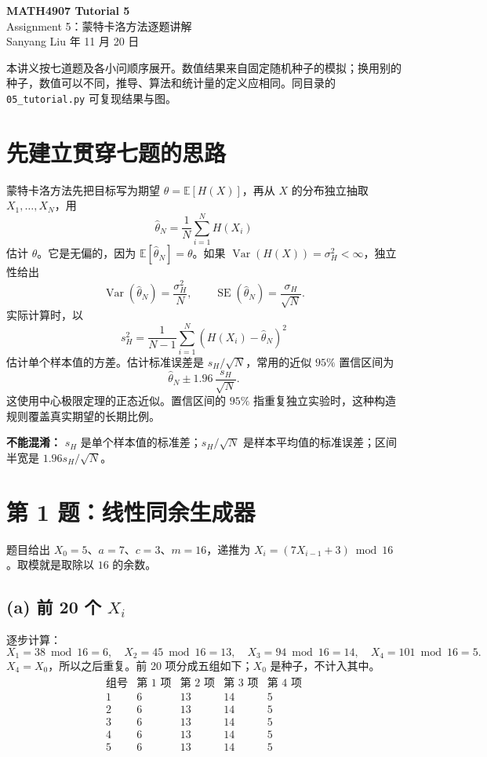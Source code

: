 \documentclass[UTF8,11pt,a4paper,fontset=none]{ctexart}
\newcommand{\E}{\mathbb E}
\newcommand{\Var}{\operatorname{Var}}
\newcommand{\SE}{\operatorname{SE}}
\begin{document}
\begin{center}
{\huge\bfseries\color{deepblue} MATH4907 Tutorial 5}\\[3mm]
{\Large Assignment 5：蒙特卡洛方法逐题讲解}\\[5mm]
Sanyang Liu  年 11 月 20 日
\end{center}
\vspace{3mm}
\begin{idea}
本讲义按七道题及各小问顺序展开。数值结果来自固定随机种子的模拟；换用别的种子，数值可以不同，推导、算法和统计量的定义应相同。同目录的 \texttt{05\_tutorial.py} 可复现结果与图。
\end{idea}
\tableofcontents
\newpage

\section{先建立贯穿七题的思路}
蒙特卡洛方法先把目标写为期望 $\theta=\E[H(X)]$，再从 $X$ 的分布独立抽取 $X_1,\ldots,X_N$，用
\begin{equation}\label{eq:mc}
\widehat\theta_N=\frac1N\sum_{i=1}^N H(X_i)
\end{equation}
估计 $\theta$。它是无偏的，因为 $\E[\widehat\theta_N]=\theta$。如果 $\Var(H(X))=\sigma_H^2<\infty$，独立性给出
\[
\Var(\widehat\theta_N)=\frac{\sigma_H^2}{N},
\qquad \SE(\widehat\theta_N)=\frac{\sigma_H}{\sqrt N}.
\]
实际计算时，以
\[
s_H^2=\frac{1}{N-1}\sum_{i=1}^N
\left(H(X_i)-\widehat\theta_N\right)^2
\]
估计单个样本值的方差。估计标准误差是 $s_H/\sqrt N$，常用的近似 $95\%$ 置信区间为
\begin{equation}\label{eq:ci}
\widehat\theta_N\pm1.96\,\frac{s_H}{\sqrt N}.
\end{equation}
这使用中心极限定理的正态近似。置信区间的 $95\%$ 指重复独立实验时，这种构造规则覆盖真实期望的长期比例。
\begin{pitfall}
\textbf{不能混淆：} $s_H$ 是单个样本值的标准差；$s_H/\sqrt N$ 是样本平均值的标准误差；区间半宽是 $1.96s_H/\sqrt N$。
\end{pitfall}

\section{第 1 题：线性同余生成器}
题目给出 $X_0=5$、$a=7$、$c=3$、$m=16$，递推为 $X_i=(7X_{i-1}+3)\bmod16$。取模就是取除以 $16$ 的余数。

\subsection*{(a) 前 20 个 $X_i$}
逐步计算：
\[
X_1=38\bmod16=6,\quad X_2=45\bmod16=13,\quad
X_3=94\bmod16=14,\quad X_4=101\bmod16=5.
\]
$X_4=X_0$，所以之后重复。前 20 项分成五组如下；$X_0$ 是种子，不计入其中。
\[
\begin{array}{c|rrrr}
\text{组号}&\text{第 1 项}&\text{第 2 项}&\text{第 3 项}&\text{第 4 项}\\\hline
1&6&13&14&5\\2&6&13&14&5\\3&6&13&14&5\\
4&6&13&14&5\\5&6&13&14&5
\end{array}
\]
\end{document}
